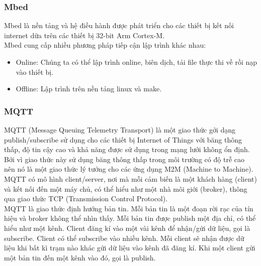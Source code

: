 \documentclass[a4paper,12pt,oneside]{article}
\begin{document}
\subsubsection{Mbed}
\noindent Mbed là nền tảng và hệ điều hành được phát triển cho các thiết bị kết nối internet dữa trên các thiết bị 32-bit Arm Cortex-M.\\
\noindent Mbed cung cấp nhiều phương pháp tiếp cận lập trình khác nhau:
\begin{itemize}
	\item Online: Chúng ta có thể lập trình online, biên dịch, tải file thực thi về rồi nạp vào thiết bị.
	\item Offline: Lập trình trên nền tảng linux và make.
\end{itemize}

\subsubsection{MQTT}
\noindent MQTT (Message Queuing Telemetry Transport) là một giao thức gởi dạng publish/subscribe sử dụng cho các thiết bị Internet of Things với băng thông thấp, độ tin cậy cao và khả năng được sử dụng trong mạng lưới không ổn định.
Bởi vì giao thức này sử dụng băng thông thấp trong môi trường có độ trễ cao nên nó là một giao thức lý tưởng cho các ứng dụng M2M (Machine to Machine).\\
 MQTT có mô hình client/server, nơi mà mỗi cảm biến là một khách hàng (client) và kết nối đến một máy chủ, có thể hiểu như một nhà môi giới (broker), thông qua giao thức TCP (Transmission Control Protocol).\\
 MQTT là giao thức định hướng bản tin. Mỗi bản tin là một đoạn rời rạc của tín hiệu và broker không thể nhìn thấy.
Mỗi bản tin được publish một địa chỉ, có thể hiểu như một kênh. Client đăng kí vào một vài kênh để nhận/gửi dữ liệu, gọi là subscribe. Client có thể subscribe vào nhiều kênh. Mỗi client sẽ nhận được dữ liệu khi bất kì trạm nào khác gửi dữ liệu vào kênh đã đăng kí. Khi một client gửi một bản tin đến một kênh vào đó, gọi là publish.
\end{document}
